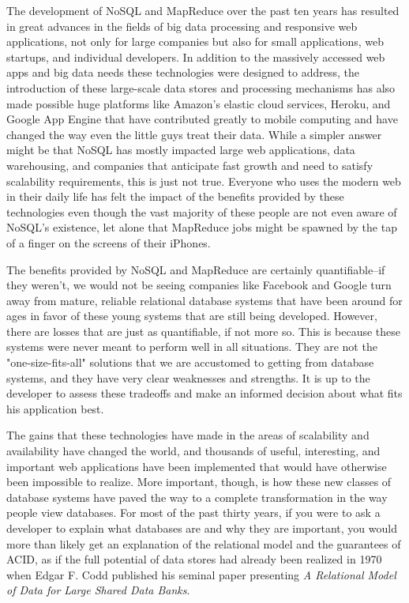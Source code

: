 \documentclass[11pt,a4paper]{report}
\begin{document}
The development of NoSQL and MapReduce over the past ten years has resulted in great advances in the fields of big data processing and responsive web applications, not only for large companies but also for small applications, web startups, and individual developers. In addition to the massively accessed web apps and big data needs these technologies were designed to address, the introduction of these large-scale data stores and processing mechanisms has also made possible huge platforms like Amazon's elastic cloud services, Heroku, and Google App Engine that have contributed greatly to mobile computing and have changed the way even the little guys treat their data. While a simpler answer might be that NoSQL has mostly impacted large web applications, data warehousing, and companies that anticipate fast growth and need to satisfy scalability requirements, this is just not true. Everyone who uses the modern web in their daily life has felt the impact of the benefits provided by these technologies even though the vast majority of these people are not even aware of NoSQL's existence, let alone that MapReduce jobs might be spawned by the tap of a finger on the screens of their iPhones. 

The benefits provided by NoSQL and MapReduce are certainly quantifiable--if they weren't, we would not be seeing companies like Facebook and Google turn away from mature, reliable relational database systems that have been around for ages in favor of these young systems that are still being developed. However, there are losses that are just as quantifiable, if not more so. This is because these systems were never meant to perform well in all situations. They are not the "one-size-fits-all" solutions that we are accustomed to getting from database systems, and they have very clear weaknesses and strengths. It is up to the developer to assess these tradeoffs and make an informed decision about what fits his application best.

The gains that these technologies have made in the areas of scalability and availability have changed the world, and thousands of useful, interesting, and important web applications have been implemented that would have otherwise been impossible to realize. More important, though, is how these new classes of database systems have paved the way to a complete transformation in the way people view databases. For most of the past thirty years, if you were to ask a developer to explain what databases are and why they are important, you would more than likely get an explanation of the relational model and the guarantees of ACID, as if the full potential of data stores had already been realized in 1970 when Edgar F. Codd published his seminal paper presenting \textit{A Relational Model of Data for Large Shared Data Banks}.\cite{cod70}
\end{document}
